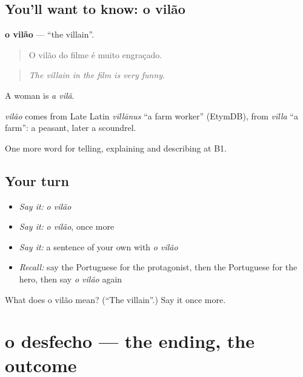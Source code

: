 \subsection*{You'll want to know: o vilão}
\textbf{o vilão} — \textquotedblleft{}the villain\textquotedblright{}.

\begin{quote}
O vilão do filme é muito engraçado.
\end{quote}

\begin{quote}
\emph{The villain in the film is very funny.}
\end{quote}

A woman is \emph{a vilã}.

\begin{cousinweb}
\emph{vilão} comes from Late Latin \emph{vīllānus} \textquotedblleft{}a farm worker\textquotedblright{} (EtymDB), from \emph{vīlla} \textquotedblleft{}a farm\textquotedblright{}: a peasant, later a scoundrel.
\end{cousinweb}

\begin{grammarlens}[title={What you've built}]
One more word for telling, explaining and describing at B1.
\end{grammarlens}

\subsection*{Your turn}
\begin{itemize}
\raggedright
  \item \emph{Say it:} \emph{o vilão}
  \item \emph{Say it:} \emph{o vilão}, once more
  \item \emph{Say it:} a sentence of your own with \emph{o vilão}
  \item \emph{Recall:} say the Portuguese for the protagonist, then the Portuguese for the hero, then say \emph{o vilão} again
\end{itemize}

\begin{tcolorbox}[breakable,colback=teal!4,colframe=teal!35!black,title={Before you move on}]
What does o vilão mean? (\textquotedblleft{}The villain\textquotedblright{}.) Say it once more.
\end{tcolorbox}
\section[o desfecho]{o desfecho — the ending, the outcome}

